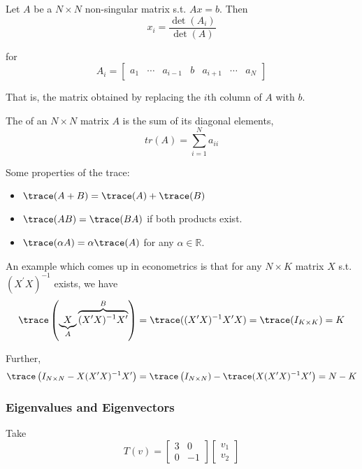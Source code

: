 \documentclass{article}
\begin{document}
\begin{theorem}
  Let $A$ be a $N \times N$ non-singular matrix s.t. $A x = b$. Then
  \[
    x_i = \dfrac{\det(A_i)}{\det(A)}
  \]

  for
  \[
    A_i = \left[\begin{matrix}
        a_1 & \cdots & a_{i - 1} & b & a_{i + 1} & \cdots & a_N
    \end{matrix}\right]
  \]

  That is, the matrix obtained by replacing the $i$th column of $A$ with $b$.
\end{theorem}

\begin{definition}
  The  of an $N \times N$ matrix $A$ is the sum of its diagonal elements,
  \[
    tr(A) = \sum^{N}_{i = 1} a_{ii}
  \]
\end{definition}

Some properties of the trace:
\begin{itemize}[label=$\bullet$]
  \item $\trace(A + B) = \trace(A) + \trace(B)$
  \item $\trace(A B) = \trace(BA)$ if both products exist.
  \item $\trace(\alpha A) = \alpha \trace(A)$ for  any $\alpha \in \mathbb{R}$.
\end{itemize}

An example which comes up in econometrics is that for any $N \times K$ matrix $X$ s.t. $\left(X^\prime X\right)^{-1}$ exists, we have
\[
  \trace\left(\underbrace{X}_{A} \overbrace{(X^\prime X)^{-1} X^\prime}^{B}\right)
  =
  \trace((X^\prime X)^{-1} X^\prime X)
  =
  \trace(I_{K \times K})
  =
  K
\]

Further,
\[
  \trace\left(I_{N \times N} - X (X^\prime X)^{-1} X^\prime\right)
  =
  \trace\left(I_{N \times N}) - \trace(X (X^\prime X)^{-1} X^\prime\right)
  =
  N - K
\]

\subsubsection{Eigenvalues and Eigenvectors}
\label{ssub:eigenvalues_and_eigenvectors}

Take
\[
  T(v) =
  \left[\begin{matrix}
    3 & 0 \\ 0 & -1
  \end{matrix}\right]
  \left[\begin{matrix}
    v_1 \\ v_2
  \end{matrix}\right]
\]
\end{document}
